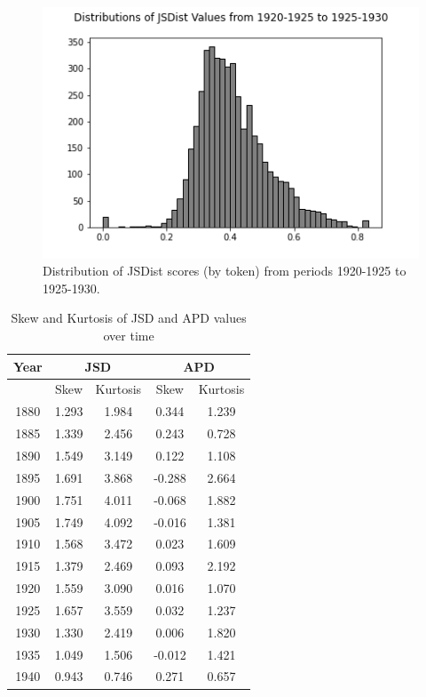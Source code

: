 \documentclass[10pt, a4paper]{article}
\begin{document}
\begin{figure}[!h]
\begin{center}
\includegraphics[scale=0.5]{code/distribution_imgs/1920_JSDist.png}
\caption{Distribution of JSDist scores (by token) from periods 1920-1925 to 1925-1930.}
\label{1920_JSDist}
\end{center}
\end{figure}

\begin{table}[!h]
\label{SkewKurtosis_JSDandAPD}
\begin{center}
\begin{tabularx}{\columnwidth}{|c|c|c|c|c|}

      \hline
      Year&\multicolumn{2}{c}{JSD}&\multicolumn{2}{c}{APD}\\
      \hline
      &Skew&Kurtosis&Skew&Kurtosis\\
      \hline
      1880&1.293&1.984&0.344&1.239\\
      \hline
      1885&1.339&2.456&0.243&0.728\\
      \hline
      1890&1.549&3.149&0.122&1.108\\
      \hline
      1895&1.691&3.868&-0.288&2.664\\
      \hline
      1900&1.751&4.011&-0.068&1.882\\
      \hline
      1905&1.749&4.092&-0.016&1.381\\
      \hline
      1910&1.568&3.472&0.023&1.609\\
      \hline
      1915&1.379&2.469&0.093&2.192\\
      \hline
      1920&1.559&3.090&0.016&1.070\\
      \hline
      1925&1.657&3.559&0.032&1.237\\
      \hline
      1930&1.330&2.419&0.006&1.820\\
      \hline
      1935&1.049&1.506&-0.012&1.421\\
      \hline
      1940&0.943&0.746&0.271&0.657\\
      \hline

\end{tabularx}
\caption{Skew and Kurtosis of JSD and APD values over time}
 \end{center}
\end{table}
\end{document}
